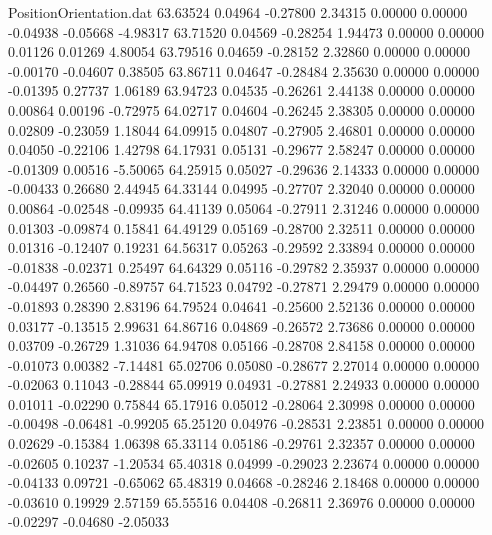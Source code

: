 \begin{filecontents}{PositionOrientation.dat}
  63.63524    0.04964   -0.27800     2.34315    0.00000    0.00000   -0.04938   -0.05668   -4.98317
  63.71520    0.04569   -0.28254     1.94473    0.00000    0.00000    0.01126    0.01269    4.80054
  63.79516    0.04659   -0.28152     2.32860    0.00000    0.00000   -0.00170   -0.04607    0.38505
  63.86711    0.04647   -0.28484     2.35630    0.00000    0.00000   -0.01395    0.27737    1.06189
  63.94723    0.04535   -0.26261     2.44138    0.00000    0.00000    0.00864    0.00196   -0.72975
  64.02717    0.04604   -0.26245     2.38305    0.00000    0.00000    0.02809   -0.23059    1.18044
  64.09915    0.04807   -0.27905     2.46801    0.00000    0.00000    0.04050   -0.22106    1.42798
  64.17931    0.05131   -0.29677     2.58247    0.00000    0.00000   -0.01309    0.00516   -5.50065
  64.25915    0.05027   -0.29636     2.14333    0.00000    0.00000   -0.00433    0.26680    2.44945
  64.33144    0.04995   -0.27707     2.32040    0.00000    0.00000    0.00864   -0.02548   -0.09935
  64.41139    0.05064   -0.27911     2.31246    0.00000    0.00000    0.01303   -0.09874    0.15841
  64.49129    0.05169   -0.28700     2.32511    0.00000    0.00000    0.01316   -0.12407    0.19231
  64.56317    0.05263   -0.29592     2.33894    0.00000    0.00000   -0.01838   -0.02371    0.25497
  64.64329    0.05116   -0.29782     2.35937    0.00000    0.00000   -0.04497    0.26560   -0.89757
  64.71523    0.04792   -0.27871     2.29479    0.00000    0.00000   -0.01893    0.28390    2.83196
  64.79524    0.04641   -0.25600     2.52136    0.00000    0.00000    0.03177   -0.13515    2.99631
  64.86716    0.04869   -0.26572     2.73686    0.00000    0.00000    0.03709   -0.26729    1.31036
  64.94708    0.05166   -0.28708     2.84158    0.00000    0.00000   -0.01073    0.00382   -7.14481
  65.02706    0.05080   -0.28677     2.27014    0.00000    0.00000   -0.02063    0.11043   -0.28844
  65.09919    0.04931   -0.27881     2.24933    0.00000    0.00000    0.01011   -0.02290    0.75844
  65.17916    0.05012   -0.28064     2.30998    0.00000    0.00000   -0.00498   -0.06481   -0.99205
  65.25120    0.04976   -0.28531     2.23851    0.00000    0.00000    0.02629   -0.15384    1.06398
  65.33114    0.05186   -0.29761     2.32357    0.00000    0.00000   -0.02605    0.10237   -1.20534
  65.40318    0.04999   -0.29023     2.23674    0.00000    0.00000   -0.04133    0.09721   -0.65062
  65.48319    0.04668   -0.28246     2.18468    0.00000    0.00000   -0.03610    0.19929    2.57159
  65.55516    0.04408   -0.26811     2.36976    0.00000    0.00000   -0.02297   -0.04680   -2.05033

\end{filecontents}
